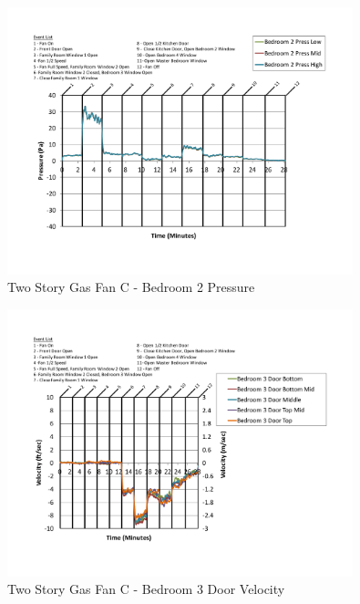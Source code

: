 \documentclass{article}
\begin{document}
\begin{appendices}
	\begin{figure}[H]
		\centering
		\includegraphics[height=3.05in,trim=0.67in 1.1in 0.67in 0.8in,clip=true]{0_Images/Results_Charts/ColdFlow/Two_Story/Gas/C/Bedroom_2_Pressure.pdf}
		\caption{Two Story Gas Fan C - Bedroom 2 Pressure}
	\end{figure}
 

	\begin{figure}[H]
		\centering
		\includegraphics[height=3.05in,trim=0.67in 1.1in 0.67in 0.8in,clip=true]{0_Images/Results_Charts/ColdFlow/Two_Story/Gas/C/Bedroom_3_Door_Velocity.pdf}
		\caption{Two Story Gas Fan C - Bedroom 3 Door Velocity}
	\end{figure}
 
	\clearpage


\end{appendices}
\end{document}
